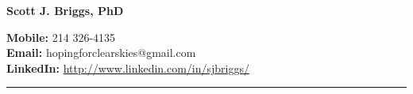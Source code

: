 \documentclass{article}
\begin{document}








\begin{center}
{\bfseries \Large Scott J. Briggs, PhD}
\end{center}

\begin{center}
{\bfseries Mobile:} 214 326-4135 \\
{\bfseries Email:} hopingforclearskies@gmail.com \\
{\bfseries LinkedIn:} \url{http://www.linkedin.com/in/sjbriggs/}
\end{center}

\begin{center}
{\par\nobreak\vspace{-5pt}\rule{7in}{0.4pt}}
\end{center}
\end{document}
